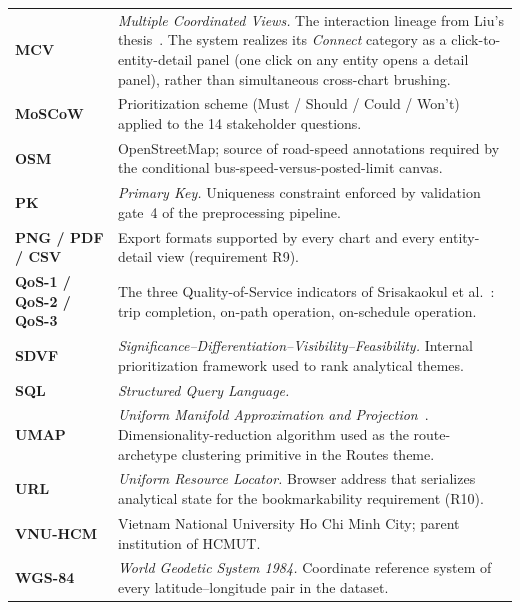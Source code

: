 \begin{longtable}{@{}p{2.5cm}p{11cm}@{}}
\textbf{MCV} & \textit{Multiple Coordinated Views.} The interaction lineage from Liu's thesis~\cite{liu2022}. The system realizes its \emph{Connect} category as a click-to-entity-detail panel (one click on any entity opens a detail panel), rather than simultaneous cross-chart brushing. \\[0.2cm]
\textbf{MoSCoW} & Prioritization scheme (Must / Should / Could / Won't) applied to the 14 stakeholder questions. \\[0.2cm]
\textbf{OSM} & OpenStreetMap; source of road-speed annotations required by the conditional bus-speed-versus-posted-limit canvas. \\[0.2cm]
\textbf{PK} & \textit{Primary Key.} Uniqueness constraint enforced by validation gate~4 of the preprocessing pipeline. \\[0.2cm]
\textbf{PNG / PDF / CSV} & Export formats supported by every chart and every entity-detail view (requirement R9). \\[0.2cm]
\textbf{QoS-1 / QoS-2 / QoS-3} & The three Quality-of-Service indicators of Srisakaokul et al.~\cite{srisakaokul2023}: trip completion, on-path operation, on-schedule operation. \\[0.2cm]
\textbf{SDVF} & \textit{Significance--Differentiation--Visibility--Feasibility.} Internal prioritization framework used to rank analytical themes. \\[0.2cm]
\textbf{SQL} & \textit{Structured Query Language.} \\[0.2cm]
\textbf{UMAP} & \textit{Uniform Manifold Approximation and Projection}~\cite{umap}. Dimensionality-reduction algorithm used as the route-archetype clustering primitive in the Routes theme. \\[0.2cm]
\textbf{URL} & \textit{Uniform Resource Locator.} Browser address that serializes analytical state for the bookmarkability requirement (R10). \\[0.2cm]
\textbf{VNU-HCM} & Vietnam National University Ho Chi Minh City; parent institution of HCMUT. \\[0.2cm]
\textbf{WGS-84} & \textit{World Geodetic System 1984.} Coordinate reference system of every latitude--longitude pair in the dataset. \\
\end{longtable}
